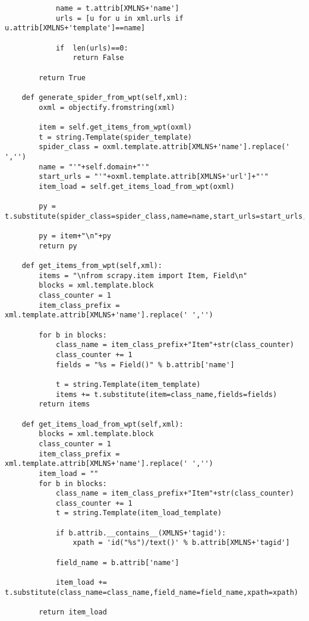 \begin{lstlisting}
            name = t.attrib[XMLNS+'name']
            urls = [u for u in xml.urls if u.attrib[XMLNS+'template']==name]

            if  len(urls)==0:
                return False

        return True

    def generate_spider_from_wpt(self,xml):
        oxml = objectify.fromstring(xml)

        item = self.get_items_from_wpt(oxml)
        t = string.Template(spider_template)
        spider_class = oxml.template.attrib[XMLNS+'name'].replace(' ','')
        name = "'"+self.domain+"'"
        start_urls = "'"+oxml.template.attrib[XMLNS+'url']+"'"
        item_load = self.get_items_load_from_wpt(oxml) 

        py = t.substitute(spider_class=spider_class,name=name,start_urls=start_urls,item_load=item_load)
        
        py = item+"\n"+py
        return py
    
    def get_items_from_wpt(self,xml):
        items = "\nfrom scrapy.item import Item, Field\n"
        blocks = xml.template.block
        class_counter = 1
        item_class_prefix = xml.template.attrib[XMLNS+'name'].replace(' ','')

        for b in blocks:
            class_name = item_class_prefix+"Item"+str(class_counter) 
            class_counter += 1
            fields = "%s = Field()" % b.attrib['name']

            t = string.Template(item_template) 
            items += t.substitute(item=class_name,fields=fields) 
        return items

    def get_items_load_from_wpt(self,xml):
        blocks = xml.template.block
        class_counter = 1
        item_class_prefix = xml.template.attrib[XMLNS+'name'].replace(' ','')
        item_load = ""
        for b in blocks:
            class_name = item_class_prefix+"Item"+str(class_counter)
            class_counter += 1
            t = string.Template(item_load_template)

            if b.attrib.__contains__(XMLNS+'tagid'):
                xpath = 'id("%s")/text()' % b.attrib[XMLNS+'tagid']
            
            field_name = b.attrib['name']

            item_load += t.substitute(class_name=class_name,field_name=field_name,xpath=xpath)

        return item_load
\end{lstlisting}

